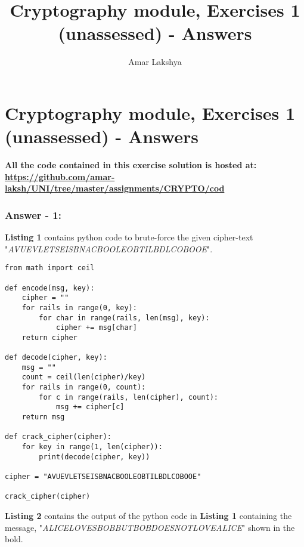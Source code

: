 \documentclass[10pt,a4paper,oneside]{article}
\author{Amar Lakshya}
\title{Cryptography module, Exercises 1 (unassessed) - Answers}
\begin{document}
\part*{Cryptography module, Exercises 1 (unassessed) - Answers}

\textbf{All the code contained in this exercise solution is hosted at:\linebreak
\href{https://github.com/amar-laksh/UNI/tree/master/assignments/CRYPTO/code}{https://github.com/amar-laksh/UNI/tree/master/assignments/CRYPTO/cod}}
\section*{Answer - 1:}

\textbf{Listing 1} contains python code to brute-force the given cipher-text "\textit{AVUEVLETSEISBNACBOOLEOBTILBDLCOBOOE}".

\begin{lstlisting}
from math import ceil

def encode(msg, key):
    cipher = ""
    for rails in range(0, key):
        for char in range(rails, len(msg), key):
            cipher += msg[char]
    return cipher

def decode(cipher, key):
    msg = ""
    count = ceil(len(cipher)/key)
    for rails in range(0, count):
        for c in range(rails, len(cipher), count):
            msg += cipher[c]
    return msg

def crack_cipher(cipher):
    for key in range(1, len(cipher)):
        print(decode(cipher, key))

cipher = "AVUEVLETSEISBNACBOOLEOBTILBDLCOBOOE"

crack_cipher(cipher)
\end{lstlisting}
\textbf{Listing 2} contains the output of the python code in \textbf{Listing 1} containing the message, "\textit{ALICELOVESBOBBUTBOBDOESNOTLOVEALICE}" shown in the bold.
\end{document}
